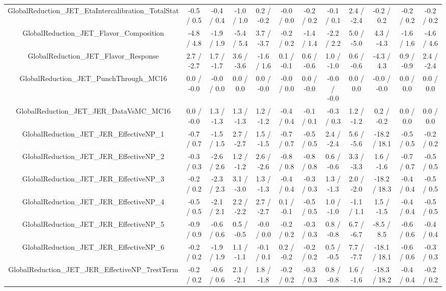 \begin{table}[htbp]
\begin{center}
\begin{tabular}{|c|c|c|c|c|c|c|c|c|c|c|c|}
  GlobalReduction_JET_EtaIntercalibration_TotalStat & -0.5 / 0.5 & -0.4 / 0.4 & -1.0 / 1.0 & 0.2 / -0.2 & -0.0 / 0.0 & -0.2 / 0.2 & -0.1 / 0.1 & 2.4 / -2.4 & -0.2 / 0.2 & -0.2 / 0.2 & -0.2 / 0.2 \\ 
  GlobalReduction_JET_Flavor_Composition & -4.8 / 4.8 & -1.9 / 1.9 & -5.4 / 5.4 & 3.7 / -3.7 & -0.2 / 0.2 & -1.4 / 1.4 & -2.2 / 2.2 & 5.0 / -5.0 & 4.3 / -4.3 & -1.6 / 1.6 & -4.6 / 4.6 \\ 
  GlobalReduction_JET_Flavor_Response & 2.7 / -2.7 & 1.7 / -1.7 & 3.6 / -3.6 & -1.6 / 1.6 & 0.1 / -0.1 & 0.6 / -0.6 & 1.0 / -1.0 & 0.6 / -0.6 & -4.3 / 4.3 & 0.9 / -0.9 & 2.4 / -2.4 \\ 
  GlobalReduction_JET_PunchThrough_MC16 & 0.0 / -0.0 & -0.0 / 0.0 & 0.0 / 0.0 & 0.0 / -0.0 & -0.0 / 0.0 & 0.0 / -0.0 & -0.0 / -0.0 & 0.0 / 0.0 & -0.0 / -0.0 & 0.0 / 0.0 & 0.0 / 0.0 \\ 
  GlobalReduction_JET_JER_DataVsMC_MC16 & 0.0 / -0.0 & 1.3 / -1.3 & 1.3 / -1.3 & 1.2 / -1.2 & -0.4 / 0.4 & -0.1 / 0.1 & -0.3 / 0.3 & 1.2 / -1.2 & 0.2 / -0.2 & 0.0 / 0.0 & 0.0 / 0.0 \\ 
  GlobalReduction_JET_JER_EffectiveNP_1 & -0.7 / 0.7 & -1.5 / 1.5 & 2.7 / -2.7 & 1.5 / -1.5 & -0.7 / 0.7 & -0.5 / 0.5 & 2.4 / -2.4 & 5.6 / -5.6 & -18.2 / 18.1 & -0.5 / 0.5 & -0.2 / 0.2 \\ 
  GlobalReduction_JET_JER_EffectiveNP_2 & -0.3 / 0.3 & -2.6 / 2.6 & 1.2 / -1.2 & 2.6 / -2.6 & -0.8 / 0.8 & -0.8 / 0.8 & 0.6 / -0.6 & 3.3 / -3.3 & 1.6 / -1.6 & -0.7 / 0.7 & -0.5 / 0.5 \\ 
  GlobalReduction_JET_JER_EffectiveNP_3 & -0.2 / 0.2 & -2.3 / 2.3 & 3.1 / -3.0 & 1.3 / -1.3 & -0.4 / 0.4 & -0.3 / 0.3 & 1.3 / -1.3 & 2.0 / -2.0 & -18.2 / 18.3 & -0.4 / 0.4 & -0.5 / 0.5 \\ 
  GlobalReduction_JET_JER_EffectiveNP_4 & -0.5 / 0.5 & -2.1 / 2.1 & 2.2 / -2.2 & 2.7 / -2.7 & 0.1 / -0.1 & -0.5 / 0.5 & 1.0 / -1.0 & -1.1 / 1.1 & 1.5 / -1.5 & -0.4 / 0.4 & -0.5 / 0.5 \\ 
  GlobalReduction_JET_JER_EffectiveNP_5 & -0.9 / 0.9 & -0.6 / 0.6 & 0.5 / -0.5 & -0.0 / 0.0 & -0.2 / 0.2 & -0.3 / 0.3 & 0.8 / -0.8 & 6.7 / -6.7 & -8.5 / 8.5 & -0.6 / 0.6 & -0.4 / 0.4 \\ 
  GlobalReduction_JET_JER_EffectiveNP_6 & -0.2 / 0.2 & -1.9 / 1.9 & 1.1 / -1.1 & -0.1 / 0.1 & 0.2 / -0.2 & -0.2 / 0.2 & 0.5 / -0.5 & 7.7 / -7.7 & -18.1 / 18.1 & -0.6 / 0.6 & -0.3 / 0.3 \\ 
  GlobalReduction_JET_JER_EffectiveNP_7restTerm & -0.2 / 0.2 & -0.6 / 0.6 & 2.1 / -2.1 & 1.8 / -1.8 & -0.2 / 0.2 & -0.3 / 0.3 & 0.8 / -0.8 & 1.6 / -1.6 & -18.3 / 18.2 & -0.4 / 0.4 & -0.2 / 0.2 \\ 

\end{tabular}
\end{center}
\end{table}
